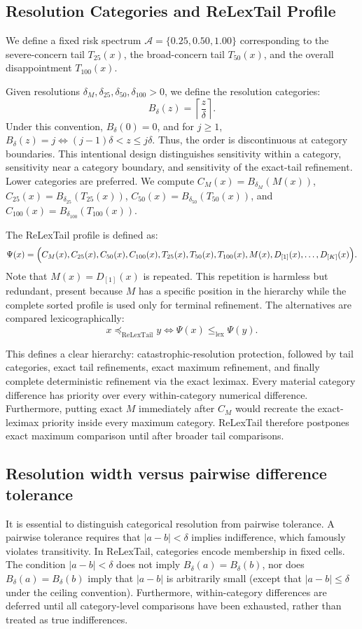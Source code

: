 \subsection{Resolution Categories and ReLexTail Profile}
We define a fixed risk spectrum $\mathcal A = \{0.25, 0.50, 1.00\}$ corresponding to the severe-concern tail $T_{25}(x)$, the broad-concern tail $T_{50}(x)$, and the overall disappointment $T_{100}(x)$.

Given resolutions $\delta_M, \delta_{25}, \delta_{50}, \delta_{100} > 0$, we define the resolution categories:
\[ B_\delta(z) = \left\lceil \frac{z}{\delta} \right\rceil. \]
Under this convention, $B_\delta(0) = 0$, and for $j \ge 1$, $B_\delta(z) = j \iff (j-1)\delta < z \le j\delta$. Thus, the order is discontinuous at category boundaries. This intentional design distinguishes sensitivity within a category, sensitivity near a category boundary, and sensitivity of the exact-tail refinement.
Lower categories are preferred. We compute $C_M(x) = B_{\delta_M}(M(x))$, $C_{25}(x) = B_{\delta_{25}}(T_{25}(x))$, $C_{50}(x) = B_{\delta_{50}}(T_{50}(x))$, and $C_{100}(x) = B_{\delta_{100}}(T_{100}(x))$.

The ReLexTail profile is defined as:
\[ \Psi(x) = \Bigl(C_M(x), C_{25}(x), C_{50}(x), C_{100}(x), T_{25}(x), T_{50}(x), T_{100}(x), M(x), D_{[1]}(x), \ldots, D_{[K]}(x)\Bigr). \]
Note that $M(x) = D_{[1]}(x)$ is repeated. This repetition is harmless but redundant, present because $M$ has a specific position in the hierarchy while the complete sorted profile is used only for terminal refinement.
The alternatives are compared lexicographically:
\[ x \preceq_{\mathrm{ReLexTail}} y \iff \Psi(x) \leq_{\mathrm{lex}} \Psi(y). \]

This defines a clear hierarchy: catastrophic-resolution protection, followed by tail categories, exact tail refinements, exact maximum refinement, and finally complete deterministic refinement via the exact leximax. Every material category difference has priority over every within-category numerical difference. Furthermore, putting exact $M$ immediately after $C_M$ would recreate the exact-leximax priority inside every maximum category. ReLexTail therefore postpones exact maximum comparison until after broader tail comparisons.

\subsection{Resolution width versus pairwise difference tolerance}
It is essential to distinguish categorical resolution from pairwise tolerance. A pairwise tolerance requires that $|a-b| < \delta$ implies indifference, which famously violates transitivity. In ReLexTail, categories encode membership in fixed cells. The condition $|a-b| < \delta$ does not imply $B_\delta(a) = B_\delta(b)$, nor does $B_\delta(a) = B_\delta(b)$ imply that $|a-b|$ is arbitrarily small (except that $|a-b| \leq \delta$ under the ceiling convention). Furthermore, within-category differences are deferred until all category-level comparisons have been exhausted, rather than treated as true indifferences.

